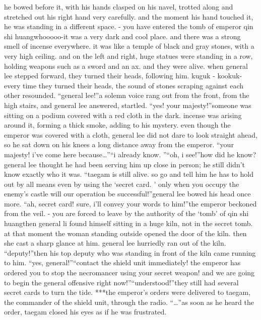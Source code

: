 he bowed before it, with his hands clasped on his navel, trotted along and stretched out his right hand very carefully.
and the moment his hand touched it, he was standing in a different space.
- you have entered the tomb of emperor qin shi huangwhooooo-it was a very dark and cool place.
 and there was a strong smell of incense everywhere.
it was like a temple of black and gray stones, with a very high ceiling.
 and on the left and right, huge statues were standing in a row, holding weapons such as a sword and an ax.
and they were alive.
 when general lee stepped forward, they turned their heads, following him.
kuguk - kookuk-every time they turned their heads, the sound of stones scraping against each other resounded.
“general lee!”a solemn voice rang out from the front, from the high stairs, and general lee answered, startled.
 “yes! your majesty!”someone was sitting on a podium covered with a red cloth in the dark.
 incense was arising around it, forming a thick smoke, adding to his mystery.
even though the emperor was covered with a cloth, general lee did not dare to look straight ahead, so he sat down on his knees a long distance away from the emperor.
“your majesty! i’ve come here because…”“i already know.
”“oh, i see!”how did he know? general lee thought he had been serving him up close in person; he still didn’t know exactly who it was.
“taegam is still alive.
 so go and tell him he has to hold out by all means even by using the ‘secret card.
’ only when you occupy the enemy’s castle will our operation be successful!”general lee bowed his head once more.
“ah, secret card! sure, i’ll convey your words to him!”the emperor beckoned from the veil.
- you are forced to leave by the authority of the ‘tomb’ of qin shi huangthen general li found himself sitting in a huge kiln, not in the secret tomb.
at that moment the woman standing outside opened the door of the kiln.
 then she cast a sharp glance at him.
 general lee hurriedly ran out of the kiln.
“deputy!”then his top deputy who was standing in front of the kiln came running to him.
“yes, general!”“contact the shield unit immediately! the emperor has ordered you to stop the necromancer using your secret weapon! and we are going to begin the general offensive right now!”“understood!”they still had several secret cards to turn the tide.
***the emperor’s orders were delivered to taegam, the commander of the shield unit, through the radio.
“…”as soon as he heard the order, taegam closed his eyes as if he was frustrated.


